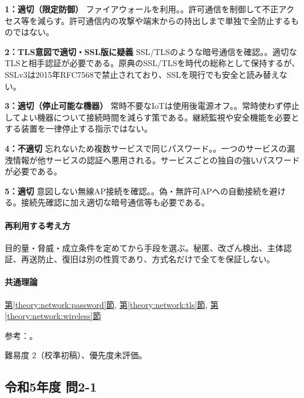 \noindent\textbf{1：適切（限定防御）} ファイアウォールを利用。。許可通信を制御して不正アクセス等を減らす。許可通信内の攻撃や端末からの持出しまで単独で全防止するものではない。\par

\noindent\textbf{2：TLS意図で適切・SSL版に疑義} SSL/TLSのような暗号通信を確認。。適切なTLSと相手認証が必要である。原典のSSL/TLSを時代の総称として保持するが、SSLv3は2015年RFC7568で禁止されており、SSLを現行でも安全と読み替えない。\par

\noindent\textbf{3：適切（停止可能な機器）} 常時不要なIoTは使用後電源オフ。。常時使わず停止してよい機器について接続時間を減らす策である。継続監視や安全機能を必要とする装置を一律停止する指示ではない。\par

\noindent\textbf{4：不適切} 忘れないため複数サービスで同じパスワード。。一つのサービスの漏洩情報が他サービスの認証へ悪用される。サービスごとの独自の強いパスワードが必要である。\par

\noindent\textbf{5：適切} 意図しない無線AP接続を確認。。偽・無許可APへの自動接続を避ける。接続先確認に加え適切な暗号通信等も必要である。\par

\paragraph{再利用する考え方} 目的量・脅威・成立条件を定めてから手段を選ぶ。秘匿、改ざん検出、主体認証、再送防止、復旧は別の性質であり、方式名だけで全てを保証しない。

\paragraph{共通理論} \hyperref[theory:network:password]{第\ref*{theory:network:password}節}, \hyperref[theory:network:tls]{第\ref*{theory:network:tls}節}, \hyperref[theory:network:wireless]{第\ref*{theory:network:wireless}節}

\par 参考：\cite{net_ssl2015,net_ipa_account,net_wep}。

\par 難易度 2（校準初稿）、優先度未評価。

\subsection{令和5年度 問2-1}
\label{q:r05-reg-basic-2-1}

